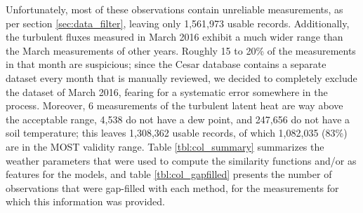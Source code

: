 \documentclass[a4paper,11pt]{kth-mag}
\begin{document}
Unfortunately, most of these observations contain unreliable measurements, as per section \ref{sec:data_filter}, leaving only  1,561,973 usable records. Additionally, the turbulent fluxes measured in March 2016 exhibit a much wider range than the March measurements of other years. Roughly 15 to 20\% of the measurements in that month are suspicious; since the Cesar database contains a separate dataset every month that is manually reviewed, we decided to completely exclude the dataset of March 2016, fearing for a systematic error somewhere in the process. Moreover, 6 measurements of the turbulent latent heat are way above the acceptable range, 4,538 do not have a dew point, and 247,656 do not have a soil temperature; this leaves 1,308,362 usable records, of which 1,082,035 (83\%) are in the MOST validity range. Table \ref{tbl:col_summary} summarizes the weather parameters that were used to compute the similarity functions and/or as features for the models, and table \ref{tbl:col_gapfilled} presents the number of observations that were gap-filled with each method, for the measurements for which this information was provided.
\end{document}
